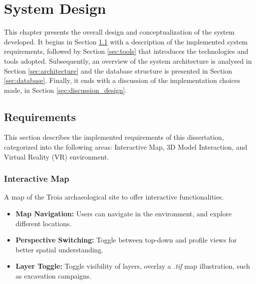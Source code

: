 
%
\chapter{System Design}
\label{cha:system_design}
This chapter presents the overall design and conceptualization of the system developed. It begins in Section \ref{sec:requirements} with a description of the implemented system requirements, followed by Section \ref{sec:tools} that introduces the technologies and tools adopted.
Subsequently, an overview of the system architecture is analysed in Section \ref{sec:architecture} and the database structure is presented in Section \ref{sec:database}.
Finally, it ends with a discussion of the implementation choices made, in Section \ref{sec:discussion_design}.

\section{Requirements}
\label{sec:requirements}

This section describes the implemented requirements of this dissertation, categorized into the following areas: Interactive Map, \gls{3D} Model Interaction, and Virtual Reality (\gls{VR}) environment.

\subsection*{Interactive Map}
A map of the Troia archaeological site to offer interactive functionalities.
\begin{itemize}
    \item \textbf{Map Navigation:} Users can navigate in the environment, and explore different locations.
    \item \textbf{Perspective Switching:} Toggle between top-down and profile views for better spatial understanding.
    \item \textbf{Layer Toggle:} Toggle visibility of layers, overlay a \textit{.tif} map illustration, such as excavation campaigns.
\end{itemize}

